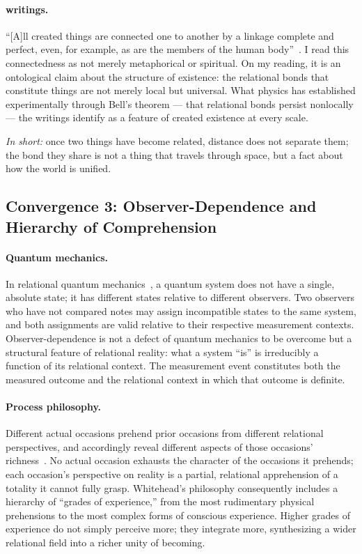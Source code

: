 \paragraph{\bahai writings.}
``[A]ll created things are connected one to another by a linkage
complete and perfect, even, for example, as are the members of the
human body''~\citep[\S 21]{SelectionsAbdul}.
I read this connectedness as not merely metaphorical or spiritual.
On my reading, it is an ontological claim about the structure of existence:
the relational bonds that constitute things are not merely local but universal.
What physics has established experimentally through Bell's theorem ---
that relational bonds persist nonlocally --- the writings identify as
a feature of created existence at every scale.

\emph{In short:} once two things have become related, distance does not
separate them; the bond they share is not a thing that travels through
space, but a fact about how the world is unified.

\subsection{Convergence 3: Observer-Dependence and Hierarchy of Comprehension}

\paragraph{Quantum mechanics.}
In relational quantum mechanics~\citep{Rovelli1996}, a quantum system
does not have a single, absolute state; it has different states relative
to different observers.
Two observers who have not compared notes may assign incompatible states
to the same system, and both assignments are valid relative to their
respective measurement contexts.
Observer-dependence is not a defect of quantum mechanics to be overcome
but a structural feature of relational reality: what a system ``is''
is irreducibly a function of its relational context.
The measurement event constitutes both the measured outcome and the
relational context in which that outcome is definite.

\paragraph{Process philosophy.}
Different actual occasions prehend prior occasions from different relational
perspectives, and accordingly reveal different aspects of those occasions'
richness~\citep{Whitehead1933}.
No actual occasion exhausts the character of the occasions it prehends;
each occasion's perspective on reality is a partial, relational apprehension
of a totality it cannot fully grasp.
Whitehead's philosophy consequently includes a hierarchy of ``grades of
experience,'' from the most rudimentary physical prehensions to the most
complex forms of conscious experience.
Higher grades of experience do not simply perceive more; they integrate
more, synthesizing a wider relational field into a richer unity of becoming.

